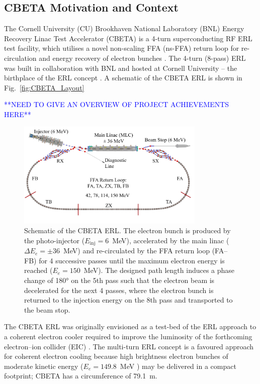 \documentclass[../main.tex]{subfiles}
\begin{document}
\subsection{CBETA Motivation and Context}

The Cornell University (CU) Brookhaven National Laboratory (BNL) Energy Recovery Linac Test Accelerator (CBETA) is a 4-turn superconducting RF ERL test facility, which utilises a novel non-scaling FFA (ns-FFA) return loop for re-circulation and energy recovery of electron bunches \cite{hoffstaetter2017cbeta,bartnik2020cbeta}. The 4-turn (8-pass) ERL was built in collaboration with BNL and hosted at Cornell University -- the birthplace of the ERL concept \cite{tigner1965possible}. A schematic of the CBETA ERL is shown in Fig.~\ref{fig:CBETA_Layout}

\textcolor{blue}{**NEED TO GIVE AN OVERVIEW OF PROJECT ACHIEVEMENTS HERE**}

\begin{figure}[!h]
\centering
\includegraphics[width=0.8\textwidth]{Figures/CBETA_Multi-Pass_Commissioning/CBETA_4turn.pdf}
\caption{Schematic of the CBETA ERL. The electron bunch is produced by the photo-injector ($E_{\mathrm{inj}} = 6$~\si{\mega\electronvolt}), accelerated by the main linac ($\Delta E_{e} = \pm 36$~\si{\mega\electronvolt}) and re-circulated by the FFA return loop (FA--FB) for 4 successive passes until the maximum electron energy is reached ($E_{e} = 150$~\si{\mega\electronvolt}). The designed path length induces a phase change of 180\si{\degree} on the 5th pass such that the electron beam is decelerated for the next 4 passes, where the electron bunch is returned to the injection energy on the 8th pass and transported to the beam stop.}
\label{fig:CBETA_layout}
\end{figure}

The CBETA ERL was originally envisioned as a test-bed of the ERL approach to a coherent electron cooler \cite{derbenev1991coherent,litvinenko2009coherent} required to improve the luminosity of the forthcoming electron--ion collider (EIC) \cite{willeke2021electron}. The multi-turn ERL concept is a favoured approach for coherent electron cooling because high brightness electron bunches of moderate kinetic energy ($E_{e} = 149.8$~\si{\mega\electronvolt} \cite{willeke2021electron}) may be delivered in a compact footprint; CBETA has a circumference of 79.1~\si{\meter}. 
\end{document}
